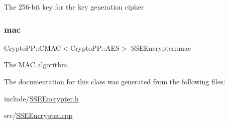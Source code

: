 The 256-\/bit key for the key generation cipher \mbox{\label{classSSEEncrypter_a67939726bb84cb761535642873c3b10c}} 
\subsubsection{\texorpdfstring{mac}{mac}}
{\footnotesize\ttfamily Crypto\+P\+P\+::\+C\+M\+AC$<$Crypto\+P\+P\+::\+A\+ES$>$ S\+S\+E\+Encrypter\+::mac\hspace{0.3cm}{\ttfamily [private]}}

The M\+AC algorithm. 

The documentation for this class was generated from the following files\+:\begin{DoxyCompactItemize}
\item 
include/\hyperlink{SSEEncrypter_8h}{S\+S\+E\+Encrypter.\+h}\item 
src/\hyperlink{SSEEncrypter_8cpp}{S\+S\+E\+Encrypter.\+cpp}\end{DoxyCompactItemize}
